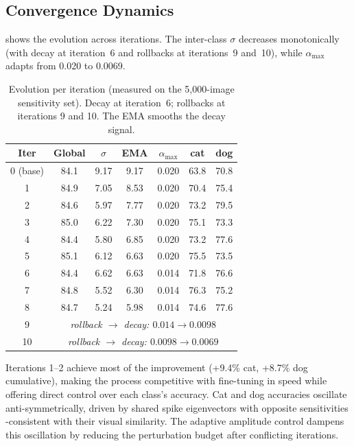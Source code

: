 \documentclass[11pt,a4paper]{article}
\begin{document}
\subsection{Convergence Dynamics}

 shows the evolution across iterations. The
inter-class $\sigma$ decreases monotonically (with decay at
iteration~6 and rollbacks at iterations~9 and~10), while
$\alpha_{\max}$ adapts from 0.020 to 0.0069.

\begin{table}[ht]
\centering
\caption{Evolution per iteration (measured on the 5,000-image sensitivity
set). Decay at iteration~6; rollbacks at iterations 9 and 10.
The EMA smooths the decay signal.}
\label{tab:iterations}
\begin{tabular}{ccccccc}
\toprule
Iter & Global & $\sigma$ & EMA & $\alpha_{\max}$ & cat & dog \\
\midrule
0 (base) & 84.1 & 9.17 & 9.17 & 0.020 & 63.8 & 70.8 \\
1 & 84.9 & 7.05 & 8.53 & 0.020 & 70.4 & 75.4 \\
2 & 84.6 & 5.97 & 7.77 & 0.020 & 73.2 & 79.5 \\
3 & 85.0 & 6.22 & 7.30 & 0.020 & 75.1 & 73.3 \\
4 & 84.4 & 5.80 & 6.85 & 0.020 & 73.2 & 77.6 \\
5 & 85.1 & 6.12 & 6.63 & 0.020 & 75.5 & 73.5 \\
6 & 84.4 & 6.62 & 6.63 & 0.014 & 71.8 & 76.6 \\
7 & 84.8 & 5.52 & 6.30 & 0.014 & 76.3 & 75.2 \\
8 & 84.7 & 5.24 & 5.98 & 0.014 & 74.6 & 77.6 \\
9 & \multicolumn{6}{c}{\textit{rollback $\to$ decay:
  $0.014 \to 0.0098$}} \\
10 & \multicolumn{6}{c}{\textit{rollback $\to$ decay:
  $0.0098 \to 0.0069$}} \\
\bottomrule
\end{tabular}
\end{table}

Iterations 1--2 achieve most of the improvement (+9.4\% cat, +8.7\%
dog cumulative), making the process competitive with fine-tuning in
speed while offering direct control over each class's accuracy. Cat
and dog accuracies oscillate anti-symmetrically, driven by shared spike
eigenvectors with opposite sensitivities -consistent with their visual
similarity. The adaptive amplitude control dampens this oscillation
by reducing the perturbation budget after conflicting iterations.
\end{document}

